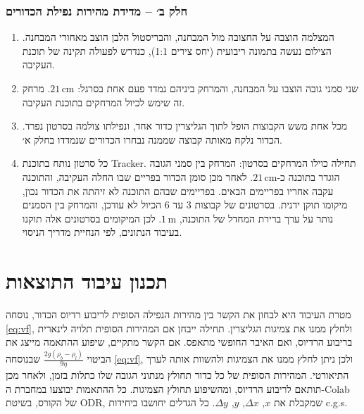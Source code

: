 \documentclass[10pt,a4paper]{article}
\newcommand{\textenglish}[1]{\foreignlanguage{english}{#1}}
\newcommand{\TODO}[1]{\textcolor{red}{[#1]}}
\newcommand{\U}[1]{\,\mathrm{#1}}
\begin{document}
\subsubsection*{חלק ב׳ -- מדידת מהירות נפילת הכדורים}
\begin{enumerate}
  \item המצלמה הוצבה על החצובה מול המבחנה, והבריסטול הלבן הוצב מאחורי המבחנה. הצילום נעשה בתמונה ריבועית (יחס צירים 1:1), כנדרש לפעולה תקינה של תוכנת העקיבה.
  \item שני סמני גובה הוצבו על המבחנה, והמרחק ביניהם נמדד פעם אחת בסרגל: $21\U{cm}$. מרחק זה שימש לכיול המרחקים בתוכנת העקיבה.
  \item מכל אחת משש הקבוצות הופל לתוך הגליצרין כדור אחד, ונפילתו צולמה בסרטון נפרד. הכדור נלקח מאותה קבוצה שממנה נבחרו הכדורים שנמדדו בחלק א׳.
  \item כל סרטון נותח בתוכנת \textenglish{Tracker}. תחילה כוילו המרחקים בסרטון: המרחק בין סמני הגובה הוגדר בתוכנה כ-$21\U{cm}$. לאחר מכן סומן הכדור בפריים שבו החלה העקיבה, והתוכנה עקבה אחריו בפריימים הבאים. בפריימים שבהם התוכנה לא זיהתה את הכדור נכון, מיקומו תוקן ידנית. בסרטונים של קבוצות 3 עד 6 הכיול לא עודכן, והמרחק בין הסמנים נותר על ערך ברירת המחדל של התוכנה, $1\U{m}$. לכן המיקומים בסרטונים אלה תוקנו בעיבוד הנתונים, לפי הנחיית מדריך הניסוי.
\end{enumerate}

\section*{תכנון עיבוד התוצאות}
מטרת העיבוד היא לבחון את הקשר בין מהירות הנפילה הסופית לריבוע רדיוס הכדור, נוסחה \eqref{eq:vf}, ולחלץ ממנו את צמיגות הגליצרין. תחילה ייבחן אם המהירות הסופית תלויה לינארית בריבוע הרדיוס, ואם האיבר החופשי מתאפס. אם הקשר מתקיים, שיפוע ההתאמה מייצג את הביטוי $\frac{2g(\rho_b-\rho_l)}{9\eta}$ שבנוסחה \eqref{eq:vf}, ולכן ניתן לחלץ ממנו את הצמיגות ולהשוות אותה לערך התיאורטי. המהירות הסופית של כל כדור תחולץ מנתוני הגובה שלו כתלות בזמן, ולאחר מכן תותאם לריבוע הרדיוס, ומהשיפוע תחולץ הצמיגות. כל ההתאמות יבוצעו במחברת ה-\textenglish{Colab} של הקורס, בשיטת \textenglish{ODR}, שמקבלת את $x$, $\Delta x$, $y$, $\Delta y$. כל הגדלים יחושבו ביחידות \textenglish{c.g.s}.
\end{document}
